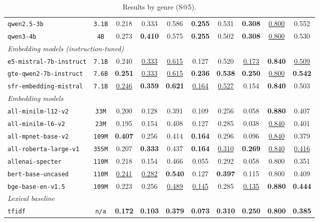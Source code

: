 \documentclass[11pt]{article}
\begin{document}
\begin{table}[h!]
{\begin{tabular}{lccccccccc}
\texttt{qwen2.5-3b} & \texttt{3.1B} & 0.218 & 0.333 & 0.586 & \textbf{0.255} & 0.531 & \textbf{0.308} & \underline{0.800} & 0.552 \\
\texttt{qwen3-4b} & \texttt{4B} & 0.273 & \textbf{0.410} & 0.575 & \textbf{0.255} & 0.502 & \textbf{0.308} & \underline{0.800} & 0.530 \\
\midrule
\multicolumn{10}{l}{\textit{Embedding models (instruction-tuned)}} \\
\midrule
\texttt{e5-mistral-7b-instruct} & \texttt{7.1B} & 0.240 & \underline{0.333} & \underline{0.615} & 0.127 & 0.520 & \underline{0.173} & \textbf{0.840} & \underline{0.509} \\
\texttt{gte-qwen2-7b-instruct} & \texttt{7.6B} & \textbf{0.251} & \underline{0.333} & \underline{0.615} & \textbf{0.236} & \textbf{0.538} & \textbf{0.250} & \underline{0.800} & \textbf{0.542} \\
\texttt{sfr-embedding-mistral} & \texttt{7.1B} & \underline{0.246} & \textbf{0.359} & \textbf{0.621} & \underline{0.164} & \underline{0.527} & 0.154 & \textbf{0.840} & 0.503 \\
\midrule
\multicolumn{10}{l}{\textit{Embedding models}} \\
\midrule
\texttt{all-minilm-l12-v2} & \texttt{33M} & 0.200 & 0.128 & 0.391 & 0.109 & 0.256 & 0.058 & \textbf{0.880} & 0.407 \\
\texttt{all-minilm-l6-v2} & \texttt{23M} & 0.195 & 0.154 & 0.408 & 0.127 & 0.285 & 0.038 & \underline{0.840} & 0.401 \\
\texttt{all-mpnet-base-v2} & \texttt{109M} & \textbf{0.407} & 0.256 & 0.414 & \textbf{0.164} & 0.296 & 0.096 & \underline{0.840} & 0.379 \\
\texttt{all-roberta-large-v1} & \texttt{355M} & 0.207 & \textbf{0.333} & 0.437 & \textbf{0.164} & \underline{0.310} & \textbf{0.269} & \underline{0.840} & \underline{0.416} \\
\texttt{allenai-specter} & \texttt{110M} & 0.218 & 0.154 & 0.466 & 0.055 & 0.292 & 0.058 & 0.800 & 0.351 \\
\texttt{bert-base-uncased} & \texttt{110M} & \underline{0.241} & \underline{0.282} & \textbf{0.540} & 0.127 & \textbf{0.397} & 0.115 & 0.800 & 0.409 \\
\texttt{bge-base-en-v1.5} & \texttt{109M} & 0.223 & 0.256 & \underline{0.489} & \underline{0.145} & 0.285 & \underline{0.135} & \textbf{0.880} & \textbf{0.444} \\
\midrule
\multicolumn{10}{l}{\textit{Lexical baseline}} \\
\midrule
\texttt{tfidf} & \texttt{n/a} & \textbf{0.172} & \textbf{0.103} & \textbf{0.379} & \textbf{0.073} & \textbf{0.310} & \textbf{0.250} & \textbf{0.800} & \textbf{0.385} \\
\bottomrule
\end{tabular}
}
\caption{
Results by genre (S@5).}
\label{tab:genre-s10-top}
\end{table}
\end{document}
